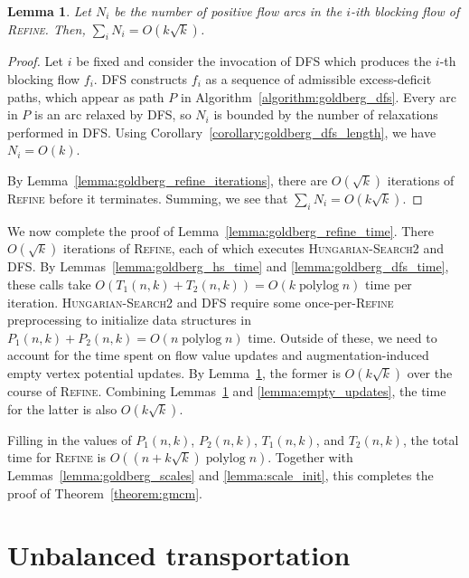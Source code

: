 \documentclass[11pt]{article}
\def\polylog{\mathop{\mathrm{polylog}}}
\theoremstyle{plain}
\newtheorem{lemma}{Lemma}[section]
\numberwithin{figure}{section}
\begin{document}
\begin{lemma}
\label{lemma:goldberg_bf_size}
Let $N_i$ be the number of positive flow arcs in the $i$-ith blocking flow
of \textsc{Refine}.
Then, $\sum_i N_i = O(k\sqrt{k})$.
\end{lemma}

\begin{proof}
Let $i$ be fixed and consider the invocation of \textsc{DFS} which produces the
$i$-th blocking flow $f_i$.
\textsc{DFS} constructs $f_i$ as a sequence of admissible excess-deficit paths,
which appear as path $P$ in Algorithm~\ref{algorithm:goldberg_dfs}.
Every arc in $P$ is an arc relaxed by \textsc{DFS}, so $N_i$ is bounded by the
number of relaxations performed in \textsc{DFS}.
Using Corollary~\ref{corollary:goldberg_dfs_length}, we have $N_i = O(k)$.

By Lemma~\ref{lemma:goldberg_refine_iterations}, there are $O(\sqrt{k})$
iterations of \textsc{Refine} before it terminates.
Summing, we see that $\sum_i N_i = O(k\sqrt{k})$.
\end{proof}

We now complete the proof of Lemma~\ref{lemma:goldberg_refine_time}.
There $O(\sqrt{k})$ iterations of \textsc{Refine}, each of which executes
\textsc{Hungarian-Search2} and \textsc{DFS}.
By Lemmas~\ref{lemma:goldberg_hs_time} and \ref{lemma:goldberg_dfs_time},
these calls take $O(T_1(n, k) + T_2(n, k)) = O(k\polylog n)$ time per
iteration.
\textsc{Hungarian-Search2} and \textsc{DFS} require some
once-per-\textsc{Refine} preprocessing to initialize data structures
in $P_1(n, k) + P_2(n, k) = O(n\polylog n)$ time.
Outside of these, we need to account for the time spent on flow value updates
and augmentation-induced empty vertex potential updates.
By Lemma~\ref{lemma:goldberg_bf_size}, the former is $O(k\sqrt{k})$ over the
course of \textsc{Refine}.
Combining Lemmas~\ref{lemma:goldberg_bf_size} and \ref{lemma:empty_updates},
the time for the latter is also $O(k\sqrt{k})$.

Filling in the values of $P_1(n, k)$, $P_2(n, k)$, $T_1(n, k)$, and
$T_2(n, k)$, the total time for \textsc{Refine} is
$O((n + k\sqrt{k})\polylog n)$.
Together with Lemmas~\ref{lemma:goldberg_scales} and \ref{lemma:scale_init},
this completes the proof of Theorem~\ref{theorem:gmcm}.


\section{Unbalanced transportation}
\end{document}
